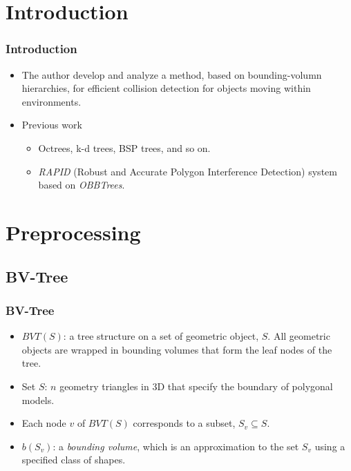 \documentclass{beamer}
\begin{document}
\section{Introduction}
    \begin{frame}
    \frametitle{Introduction}
	\begin{itemize}
		\item The author develop and analyze a method, based on bounding-volumn hierarchies, for efficient collision detection for objects moving within environments.
		\item Previous work
			\begin{itemize}
			\item Octrees, k-d trees, BSP trees, and so on.
			\item {\it RAPID} (Robust and Accurate Polygon Interference Detection) system based on {\it OBBTrees}.
			\end{itemize}
	\end{itemize}
    \end{frame}

\section{Preprocessing}

\subsection{BV-Tree}
	\begin{frame}
	\frametitle{BV-Tree}
		\begin{itemize}
			\item $BVT(S)$: a tree structure on a set of geometric object, $S$.  All geometric objects are wrapped in bounding volumes that form the leaf nodes of the tree.
			\item Set $S$: $n$ geometry triangles in 3D that specify the boundary of polygonal models.
			\item Each node $v$ of $BVT(S)$ corresponds to a subset, $S_{v} \subseteq S$.
			\item $b(S_{v})$: a {\it bounding volume}, which is an approximation to the set $S_{v}$ using a specified class of shapes.
		\end{itemize}
	\end{frame}
\end{document}
